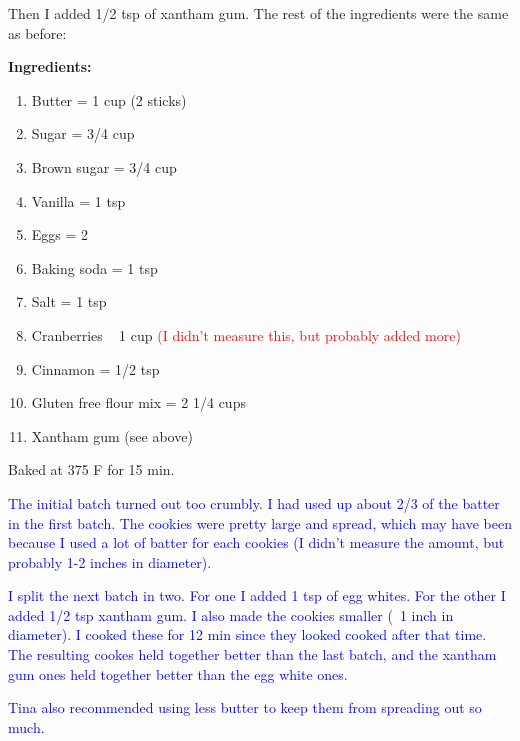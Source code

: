 \documentclass[11pt]{article}
\begin{document}
Then I added 1/2 tsp of xantham gum.  The rest of the ingredients were the same as before:

\textbf{Ingredients:}

\begin{enumerate}
\item Butter = 1 cup (2 sticks)
\item Sugar = 3/4 cup
\item Brown sugar = 3/4 cup
\item Vanilla = 1 tsp
\item Eggs = 2
\item Baking soda = 1 tsp
\item Salt = 1 tsp
\item Cranberries ~ 1 cup \textcolor{red}{(I didn't measure this, but probably added more)}
\item Cinnamon = 1/2 tsp
\item Gluten free flour mix = 2 1/4 cups
\item Xantham gum (see above)
\end{enumerate}

Baked at 375 F for 15 min.  

\textcolor{blue}{The initial batch turned out too crumbly.  I had used up about 2/3 of the batter in the first batch.  The cookies were pretty large and spread, which may have been because I used a lot of batter for each cookies (I didn't measure the amount, but probably 1-2 inches in diameter).  

I split the next batch in two.  For one I added 1 tsp of egg whites.  For the other I added 1/2 tsp xantham gum.  I also made the cookies smaller (~1 inch in diameter).  I cooked these for 12 min since they looked cooked after that time.  The resulting cookes held together better than the last batch, and the xantham gum ones held together better than the egg white ones.  

Tina also recommended using less butter to keep them from spreading out so much.}
\end{document}
